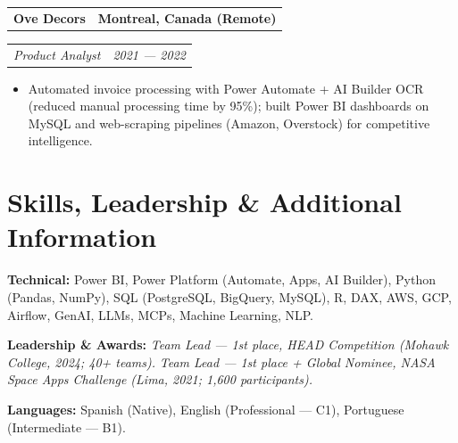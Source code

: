 \documentclass[10pt,letterpaper]{article}
\makeatletter
\newcommand{\entryhead}[2]{%
  \noindent\begin{tabularx}{\linewidth}{@{}X r@{}}
    \textbf{#1} & \textbf{#2}
  \end{tabularx}\par
}
\newcommand{\entryrole}[2]{%
  \noindent\begin{tabularx}{\linewidth}{@{}X r@{}}
    \textit{#1} & \textit{#2}
  \end{tabularx}\par\vspace{1pt}
}
\makeatother
\begin{document}
\entryhead{Ove Decors}{Montreal, Canada (Remote)}
\entryrole{Product Analyst}{2021 --- 2022}
\begin{itemize}
  \item Automated invoice processing with Power Automate + AI Builder OCR (reduced manual processing time by 95\%); built Power BI dashboards on MySQL and web-scraping pipelines (Amazon, Overstock) for competitive intelligence.
\end{itemize}

\section*{Skills, Leadership \& Additional Information}
\noindent\textbf{Technical:} Power BI, Power Platform (Automate, Apps, AI Builder), Python (Pandas, NumPy), SQL (PostgreSQL, BigQuery, MySQL), R, DAX, AWS, GCP, Airflow, GenAI, LLMs, MCPs, Machine Learning, NLP.\par
\noindent\textbf{Leadership \& Awards:} \textit{Team Lead --- 1st place, HEAD Competition (Mohawk College, 2024; 40+ teams).} \textit{Team Lead --- 1st place + Global Nominee, NASA Space Apps Challenge (Lima, 2021; 1{,}600 participants).}\par
\noindent\textbf{Languages:} Spanish (Native), English (Professional --- C1), Portuguese (Intermediate --- B1).
\end{document}

